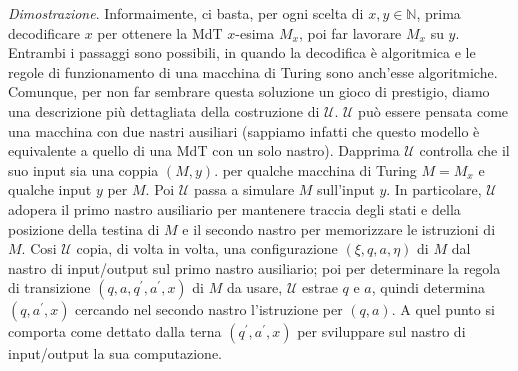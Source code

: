 \textit{Dimostrazione}. Informaimente, ci basta, per ogni scelta
di $x, y \in \mathbb{N}$, prima decodificare $x$ per ottenere la MdT $x$-esima $M_x$,
poi far lavorare $M_x$ su $y$. Entrambi i passaggi sono possibili, in quando la
decodifica è algoritmica e le regole di funzionamento di una macchina di Turing sono
anch'esse algoritmiche. Comunque, per non far sembrare questa soluzione un gioco di
prestigio, diamo una descrizione più dettagliata della costruzione di $\mathcal{U}$.
$\mathcal{U}$ può essere pensata come una macchina con due nastri ausiliari (sappiamo
infatti che questo modello è equivalente a quello di una MdT con un solo nastro).
Dapprima $\mathcal{U}$ controlla che il suo input sia una coppia $(M, y)$. per
qualche macchina di Turing $M=M_x$ e qualche input $y$ per $M$. Poi $\mathcal{U}$ passa
a simulare $M$ sull'input $y$. In particolare, $\mathcal{U}$ adopera il primo nastro
ausiliario per mantenere traccia degli stati e della posizione della testina di $M$ e
il secondo nastro per memorizzare le istruzioni di $M$. Cosi $\mathcal{U}$ copia, di volta in
volta, una configurazione $(\xi, q, a, \eta)$ di $M$ dal nastro di input/output sul
primo nastro ausiliario; poi per determinare la regola di transizione $\left(q, a, q^{\prime},
    a^{\prime}, x\right)$ di $M$ da usare, $\mathcal{U}$ estrae $q$ e $a$, quindi determina
$\left(q, a^{\prime}, x\right)$ cercando nel secondo nastro l'istruzione per
$(q, a)$. A quel punto si comporta come dettato dalla terna $\left(q^{\prime},
    a^{\prime}, x\right)$ per sviluppare sul nastro di input/output la sua computazione.